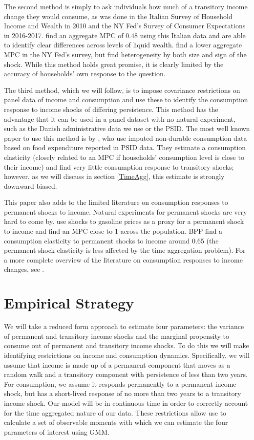 \documentclass[titlepage]{\econtex}\newcommand{\texname}{ConsumptionHeterogeneity}
\begin{document}
The second method is simply to ask individuals how much of a transitory income change they would consume, as was done in the Italian Survey of Household Income and Wealth in 2010 and the NY Fed's Survey of Consumer
Expectations in 2016-2017. \cite{jappelli_fiscal_2014} find an aggregate MPC of 0.48 using this Italian data and are able to identify clear differences across levels of liquid wealth. \cite{fuster_what_2018} find a lower aggregate MPC in the NY Fed's survey, but find heterogeneity by both size and sign of the shock. While this method holds great promise, it is clearly limited by the accuracy of households' own response to the question.

The third method, which we will follow, is to impose covariance restrictions on panel data of income and consumption and use these to identify the consumption response to income shocks of differing persistence. This method has the advantage that it can be used in a panel dataset with no natural experiment, such as the Danish administrative data we use or the PSID. The most well known paper to use this method is by \cite{blundell_consumption_2008}, who use imputed non-durable consumption data based on food expenditure reported in PSID data. They estimate a consumption elasticity (closely related to an MPC if households' consumption level is close to their income) and find very little consumption response to transitory shocks; however, as we will discuss in section \ref{TimeAgg}, this estimate is strongly downward biased.

This paper also adds to the limited literature on consumption responses to permanent shocks to income. Natural experiments for permanent shocks are very hard to come by. \cite{gelman_response_2016} use shocks to gasoline prices as a proxy for a permanent shock to income and find an MPC close to 1 across the population. BPP find a consumption elasticity to permanent shocks to income around 0.65 (the permanent shock elasticity is less affected by the time aggregation problem). For a more complete overview of the literature on consumption responses to income changes, see \cite{jappelli_consumption_2010}.

\section{Empirical Strategy} \label{empirical_strategy} 
We will take a reduced form approach to estimate four parameters: the variance of permanent and transitory income shocks and the marginal propensity to consume out of permanent and transitory income shocks. To do this we will make identifying restrictions on income and consumption dynamics. Specifically, we will assume that income is made up of a permanent component that moves as a random walk and a transitory component with persistence of less than two years. For consumption, we assume it responds permanently to a permanent income shock, but has a short-lived response of no more than two years to a transitory income shock. Our model will be in continuous time in order to correctly account for the time aggregated nature of our data. These restrictions allow use to calculate a set of observable moments with which we can estimate the four parameters of interest using GMM.
\end{document}
